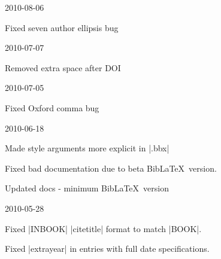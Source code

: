 \documentclass{ltxdockit}
\begin{document}
\begin{changelog}
\begin{release}{1.8}{2010-08-06}
\item Fixed seven author ellipsis bug
\end{release}




\begin{release}{1.4}{2010-07-07}
\item Removed extra space after DOI
\end{release}

\begin{release}{1.3}{2010-07-05}
\item Fixed Oxford comma bug
\end{release}

\begin{release}{1.2}{2010-06-18}
\item Made style arguments more explicit in |.bbx|
\item Fixed bad documentation due to beta Bib\LaTeX\ version.
\item Updated docs - minimum Bib\LaTeX\ version
\end{release}

\begin{release}{1.1}{2010-05-28}
\item Fixed |INBOOK| |citetitle| format to match |BOOK|.
\item Fixed |extrayear| in entries with full date specifications.
\end{release}


\end{changelog}
\end{document}
